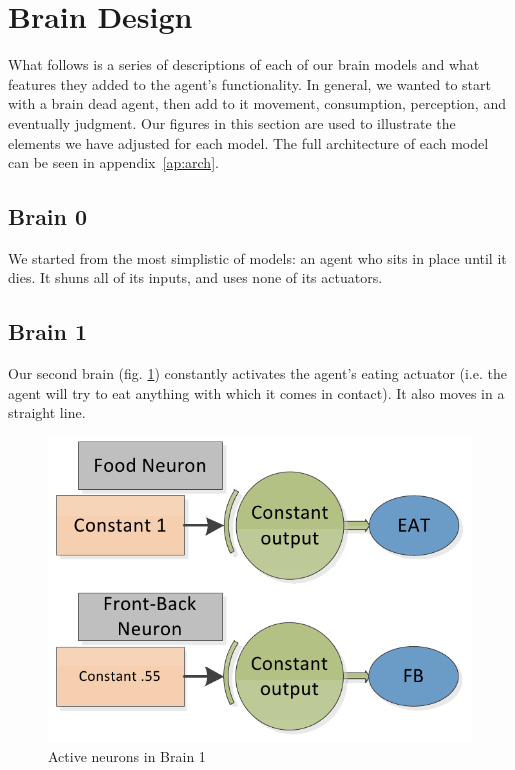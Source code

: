 \section{Brain Design} \label{sec:brain}
What follows is a series of descriptions of each of our brain models and what
features they added to the agent's functionality. In general, we wanted to 
start with a brain dead agent, then add to it movement, consumption, 
perception, and eventually judgment. Our figures in this section are used to 
illustrate the elements we have adjusted for each model. The full 
architecture of each model can be seen in appendix~\ref{ap:arch}.

\subsection{Brain 0}
We started from the most simplistic of models: an agent who sits in place until
it dies. It shuns all of its inputs, and uses none of its actuators.

\subsection{Brain 1}

Our second brain (fig. \ref{fig:brain1}) constantly activates the agent's 
eating actuator (i.e. the agent will try to eat anything with which it comes
in contact). It also moves in a straight line.

\begin{figure}
\begin{center}
  \includegraphics[scale=.3]{img/brain1.png}
  \caption{Active neurons in Brain 1}
  \label{fig:brain1}
\end{center}
\end{figure}

